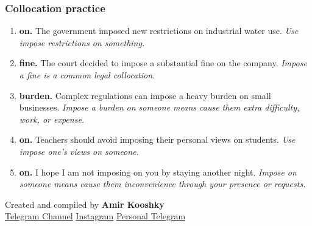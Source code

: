 \documentclass[11pt]{article}
\begin{document}
\subsubsection{Collocation practice}
\begin{enumerate}
  \item \textbf{on.} The government imposed new restrictions on industrial water use. \emph{Use impose restrictions on something.}
  \item \textbf{fine.} The court decided to impose a substantial fine on the company. \emph{Impose a fine is a common legal collocation.}
  \item \textbf{burden.} Complex regulations can impose a heavy burden on small businesses. \emph{Impose a burden on someone means cause them extra difficulty, work, or expense.}
  \item \textbf{on.} Teachers should avoid imposing their personal views on students. \emph{Use impose one's views on someone.}
  \item \textbf{on.} I hope I am not imposing on you by staying another night. \emph{Impose on someone means cause them inconvenience through your presence or requests.}
\end{enumerate}

\vfill
\begin{center}
\small\color{Muted} Created and compiled by \textbf{Amir Kooshky}\\
\href{https://t.me/KooshkyTOEFL}{Telegram Channel}\quad\textbullet\quad
\href{https://www.instagram.com/kooshkytoefl}{Instagram}\quad\textbullet\quad
\href{https://t.me/KooshkyTOEFL\_pv}{Personal Telegram}
\end{center}
\end{document}
